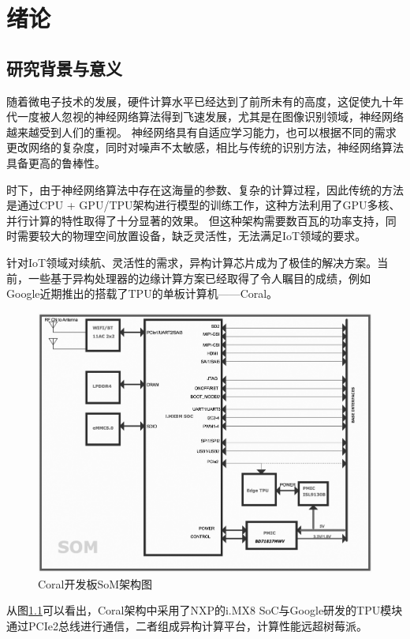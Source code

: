 \chapter{绪论}

\section{研究背景与意义}
    随着微电子技术的发展，硬件计算水平已经达到了前所未有的高度，这促使九十年代一度被人忽视的神经网络算法得到飞速发展，尤其是在图像识别领域，神经网络越来越受到人们的重视。
    神经网络具有自适应学习能力，也可以根据不同的需求更改网络的复杂度，同时对噪声不太敏感，相比与传统的识别方法，神经网络算法具备更高的鲁棒性。

    时下，由于神经网络算法中存在这海量的参数、复杂的计算过程，因此传统的方法是通过CPU + GPU/TPU架构进行模型的训练工作，这种方法利用了GPU多核、并行计算的特性取得了十分显著的效果。
    但这种架构需要数百瓦的功率支持，同时需要较大的物理空间放置设备，缺乏灵活性，无法满足IoT领域的要求。

    针对IoT领域对续航、灵活性的需求，异构计算芯片成为了极佳的解决方案。当前，一些基于异构处理器的边缘计算方案已经取得了令人瞩目的成绩，例如Google近期推出的搭载了TPU的单板计算机——Coral。
    \begin{figure}
        \centering
        \includegraphics[scale=0.2]{../pdf/coral.png}
        \caption{Coral开发板SoM架构图}
        \label{coral}
    \end{figure}
    从图\ref{coral}可以看出，Coral架构中采用了NXP的i.MX8 SoC与Google研发的TPU模块通过PCIe2总线进行通信，二者组成异构计算平台，计算性能远超树莓派。

